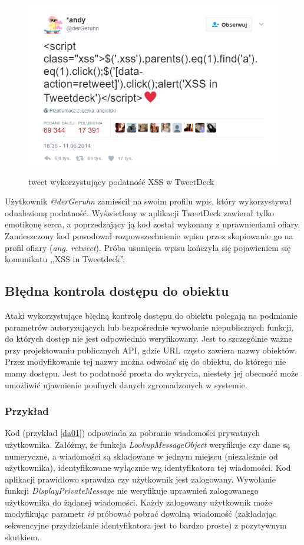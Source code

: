 \documentclass[11pt,a4paper,polish,thesis,oneside]{dcsbook}
\begin{document}
\begin{figure}[h]
\centering
\includegraphics[scale=0.75]{tweetdeck}
\label{tweetdeckpng}
\caption{tweet wykorzystujący podatność XSS w TweetDeck}
\end{figure}

Użytkownik \textit{@derGeruhn} zamieścił na swoim profilu wpis, który wykorzystywał odnalezioną podatność. Wyświetlony w aplikacji TweetDeck zawierał tylko emotikonę serca, a poprzedzający ją kod został wykonany z uprawnieniami ofiary. Zamieszczony kod powodował rozpowszechnienie wpisu przez skopiowanie go na profil ofiary (\textit{ang. retweet}). Próba usunięcia wpisu kończyła się pojawieniem się komunikatu ,,XSS in Tweetdeck''.

\subsection{Błędna kontrola dostępu do obiektu}
Ataki wykorzystujące błędną kontrolę dostępu do obiektu polegają na podmianie parametrów autoryzujących lub bezpośrednie wywołanie niepublicznych funkcji, do których dostęp nie jest odpowiednio weryfikowany. Jest to szczególnie ważne przy projektowaniu publicznych API, gdzie URL często zawiera nazwy obiektów. Przez modyfikowanie tej nazwy można odwołać się do obiektu, do którego nie mamy dostępu. Jest to podatność prosta do wykrycia, niestety jej obecność może umożliwić ujawnienie poufnych danych zgromadzonych w systemie.

\subsubsection*{Przykład}
Kod (przykład \ref{da01}) odpowiada za pobranie wiadomości prywatnych użytkownika. Załóżmy, że funkcja \textit{LookupMessageObject} weryfikuje czy dane są numeryczne, a wiadomości są składowane w jednym miejscu (niezależnie od użytkownika), identyfikowane wyłącznie wg identyfikatora tej wiadomości. Kod aplikacji prawidłowo sprawdza czy użytkownik jest zalogowany. Wywołanie funkcji \textit{DisplayPrivateMessage} nie weryfikuje uprawnień zalogowanego użytkownika do żądanej wiadomości. Każdy zalogowany użytkownik może modyfikując parametr \textit{id} próbować pobrać dowolną wiadomość (zakładając sekwencyjne przydzielanie identyfikatora jest to bardzo proste) z pozytywnym skutkiem.
\end{document}

